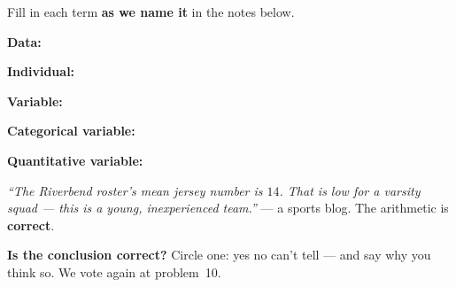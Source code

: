 \documentclass[12pt]{article}
\newcommand{\termrowheight}{2.3cm}
\newlength{\termrowinset}\setlength{\termrowinset}{7pt}
\newcommand{\vterm}[1]{%
  \par\noindent\begin{minipage}[t][\termrowheight][t]{\linewidth}%
    \vspace*{\termrowinset}%
    \textbf{\textcolor{cerulean}{#1:}}%
  \end{minipage}\par}
\begin{document}

\vspace{0.15in}

\begin{vocabbox}
\small
Fill in each term \textbf{as we name it} in the notes below.
\vterm{Data}
\vterm{Individual}
\vterm{Variable}
\vterm{Categorical variable}
\vterm{Quantitative variable}
\end{vocabbox}

\boxguard[12]
\begin{hookbox}
\small
\textit{``The Riverbend roster's mean jersey number is $14$. That is low for a varsity squad
--- this is a young, inexperienced team.''} --- a sports blog. The arithmetic is \textbf{correct}.

\vspace{3pt}
\textbf{Is the conclusion correct?} Circle one: \quad yes \qquad no \qquad can't tell
\quad --- and say why you think so. We vote again at problem~10.
\par{}
\end{hookbox}
\end{document}
